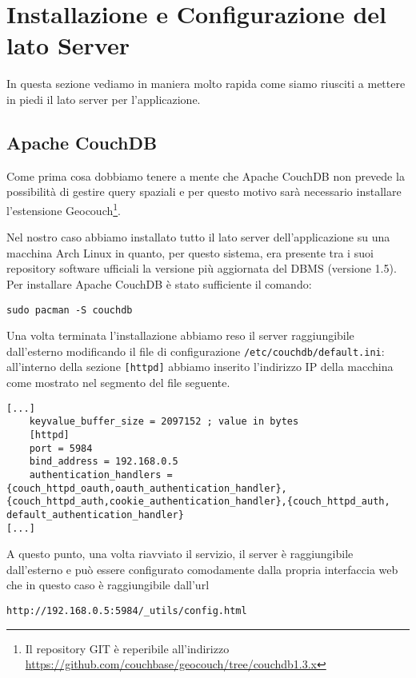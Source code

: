 \appendix
\chapter{Installazione e Configurazione del lato Server}

    In questa sezione vediamo in maniera molto rapida come siamo riusciti a 
    mettere in piedi il lato server per l'applicazione.
    
    
    \section{Apache CouchDB\texttrademark{}}
        
        Come prima cosa dobbiamo tenere a mente che Apache 
        CouchDB\texttrademark{} non prevede la possibilità di gestire query 
        spaziali e per questo motivo sarà necessario installare l'estensione 
        Geocouch\footnote{Il repository GIT è reperibile all'indirizzo 
        \url{https://github.com/couchbase/geocouch/tree/couchdb1.3.x}}.
        
        Nel nostro caso abbiamo installato tutto il lato server 
        dell'applicazione su una macchina Arch Linux in quanto, per questo 
        sistema, era presente tra i suoi repository software ufficiali la 
        versione più aggiornata del DBMS (versione 1.5). Per installare Apache 
        CouchDB\texttrademark{} è stato sufficiente il comando:
        \begin{lstlisting}[language=plane]
    sudo pacman -S couchdb
        \end{lstlisting}
        
        Una volta terminata l'installazione abbiamo reso 
        il server raggiungibile dall'esterno modificando il file di 
        configurazione \texttt{/etc/couchdb/default.ini}: all'interno della 
        sezione \verb|[httpd]| abbiamo inserito l'indirizzo IP della macchina 
        come mostrato nel segmento del file seguente.
        \begin{lstlisting}[language=plane]
[...]
    keyvalue_buffer_size = 2097152 ; value in bytes
    [httpd]
    port = 5984
    bind_address = 192.168.0.5
    authentication_handlers = {couch_httpd_oauth,oauth_authentication_handler},{couch_httpd_auth,cookie_authentication_handler},{couch_httpd_auth, default_authentication_handler}
[...]
        \end{lstlisting}
        A questo punto, una volta riavviato il servizio, il server è 
        raggiungibile dall'esterno e può essere configurato comodamente dalla 
        propria interfaccia web che in questo caso è raggiungibile dall'url 
        \begin{lstlisting}[language=plane]
    http://192.168.0.5:5984/_utils/config.html
        \end{lstlisting}
        
